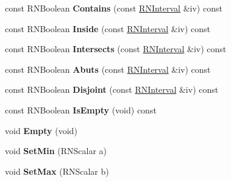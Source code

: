 \begin{DoxyCompactItemize}
\item 
const R\+N\+Boolean {\bfseries Contains} (const \hyperlink{class_r_n_interval}{R\+N\+Interval} \&iv) const \hypertarget{class_r_n_interval_aa49363cc16c4d91e2f7680bfee6d1c24}{}\label{class_r_n_interval_aa49363cc16c4d91e2f7680bfee6d1c24}

\item 
const R\+N\+Boolean {\bfseries Inside} (const \hyperlink{class_r_n_interval}{R\+N\+Interval} \&iv) const \hypertarget{class_r_n_interval_ae8361bc199fb4ba4d37cab91fa8bcf57}{}\label{class_r_n_interval_ae8361bc199fb4ba4d37cab91fa8bcf57}

\item 
const R\+N\+Boolean {\bfseries Intersects} (const \hyperlink{class_r_n_interval}{R\+N\+Interval} \&iv) const \hypertarget{class_r_n_interval_acf2598ab51b95ecb9aacee157a634ae0}{}\label{class_r_n_interval_acf2598ab51b95ecb9aacee157a634ae0}

\item 
const R\+N\+Boolean {\bfseries Abuts} (const \hyperlink{class_r_n_interval}{R\+N\+Interval} \&iv) const \hypertarget{class_r_n_interval_a8f334ffec8ca7d8bd8b97327c3e8c3c2}{}\label{class_r_n_interval_a8f334ffec8ca7d8bd8b97327c3e8c3c2}

\item 
const R\+N\+Boolean {\bfseries Disjoint} (const \hyperlink{class_r_n_interval}{R\+N\+Interval} \&iv) const \hypertarget{class_r_n_interval_ab9b664e3f0c88e7829360465a3aa58db}{}\label{class_r_n_interval_ab9b664e3f0c88e7829360465a3aa58db}

\item 
const R\+N\+Boolean {\bfseries Is\+Empty} (void) const \hypertarget{class_r_n_interval_acbaf1677fe26279d2bdd63142418e444}{}\label{class_r_n_interval_acbaf1677fe26279d2bdd63142418e444}

\item 
void {\bfseries Empty} (void)\hypertarget{class_r_n_interval_a3c19dddac49e5b98051daa58c393a954}{}\label{class_r_n_interval_a3c19dddac49e5b98051daa58c393a954}

\item 
void {\bfseries Set\+Min} (R\+N\+Scalar a)\hypertarget{class_r_n_interval_afaacf9751c9db8248cd2fe038c2ca3d0}{}\label{class_r_n_interval_afaacf9751c9db8248cd2fe038c2ca3d0}

\item 
void {\bfseries Set\+Max} (R\+N\+Scalar b)\hypertarget{class_r_n_interval_a90e473b6a6f9fcdb3082e65e3ed5eff5}{}\label{class_r_n_interval_a90e473b6a6f9fcdb3082e65e3ed5eff5}


\end{DoxyCompactItemize}
